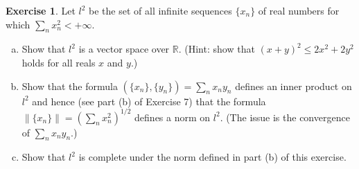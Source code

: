 \documentclass[11pt,a4paper,twoside]{article}
\theoremstyle{definition}
\newcounter{excounter}
\newtheorem{exercise}[excounter]{Exercise}
\begin{document}
\begin{exercise}

  Let $l^2$ be the set of all infinite sequences $\{ x_n \}$ of real numbers for which $\sum_n x_n^2 < +\infty$.
  \begin{enumerate}[(a)]

  \item Show that $l^2$ is a vector space over $\mathbb{R}$. (Hint: show that $(x + y)^2 \leq 2 x^2 + 2 y^2$ holds for all reals $x$ and $y$.)

  \item Show that the formula $(\{ x_n \}, \{ y_n \}) = \sum_n x_n y_n$ defines an inner product on $l^2$ and hence (see part (b) of Exercise 7)
    that the formula $\| \{ x_n \} \| = \left( \sum_n x_n^2 \right)^{1 / 2}$ defines a norm on $l^2$. (The issue is the convergence of $\sum_n x_n y_n$.)

  \item Show that $l^2$ is complete under the norm defined in part (b) of this exercise.

  \end{enumerate}

\end{exercise}
\end{document}
